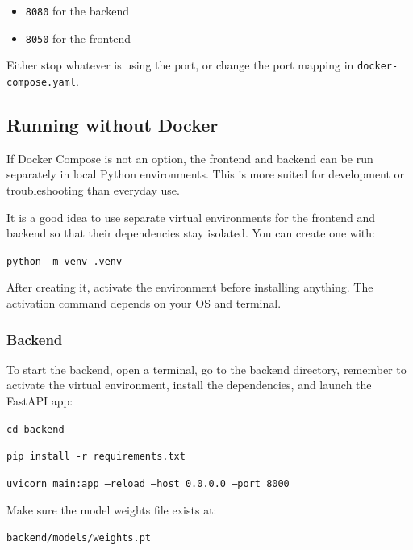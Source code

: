\documentclass{article}
\begin{document}
\begin{itemize}
    \item \texttt{8080} for the backend
    \item \texttt{8050} for the frontend
\end{itemize}

Either stop whatever is using the port, or change the port mapping in \texttt{docker-compose.yaml}.

\subsection{Running without Docker}

If Docker Compose is not an option, the frontend and backend can be run separately in local Python environments. This is more suited for development or troubleshooting than everyday use.

It is a good idea to use separate virtual environments for the frontend and backend so that their dependencies stay isolated. You can create one with:

\begin{center}
\texttt{python -m venv .venv}
\end{center}

After creating it, activate the environment before installing anything. The activation command depends on your OS and terminal.

\subsubsection{Backend}

To start the backend, open a terminal, go to the backend directory, remember to activate the virtual environment, install the dependencies, and launch the FastAPI app:

\begin{center}
\texttt{cd backend}
\end{center}

\begin{center}
\texttt{pip install -r requirements.txt}
\end{center}

\begin{center}
\texttt{uvicorn main:app --reload --host 0.0.0.0 --port 8000}
\end{center}

Make sure the model weights file exists at:

\begin{center}
\texttt{backend/models/weights.pt}
\end{center}
\end{document}
